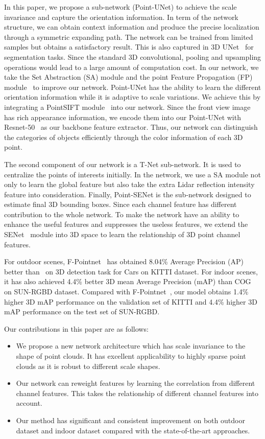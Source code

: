 \documentclass[letterpaper]{article}
\begin{document}
In this paper, we propose a sub-network (Point-UNet) to achieve the scale invariance and capture the orientation information. In term of the network structure, we can obtain context information and produce the precise localization through a symmetric expanding path. The network can be trained from limited samples but obtains a satisfactory result. This is also captured in 3D UNet~\cite{cciccek20163d} for segmentation tasks. Since the standard 3D convolutional, pooling and upsampling operations would lead to a large amount of computation cost. In our network, we take the Set Abstraction (SA) module and the point Feature Propagation (FP) module~\cite{qi2017pointnet++} to improve our network. Point-UNet has the ability to learn the different orientation information while it is adaptive to scale variations. We achieve this by integrating a PointSIFT module~\cite{jiang2018pointsift} into our network. Since the front view image has rich appearance information, we encode them into our Point-UNet with Resnet-50~\cite{he2016deep} as our backbone feature extractor. Thus, our network can distinguish the categories of objects efficiently through the color information of each 3D point.

The second component of our network is a T-Net sub-network. It is used to centralize the points of interests initially. In the network, we use a SA module not only to learn the global feature but also take the extra Lidar reflection intensity feature into consideration. Finally, Point-SENet is the sub-network designed to estimate final 3D bounding boxes. Since each channel feature has different contribution to the whole network. To make the network have an ability to enhance the useful features and suppresses the useless features, we extend the SENet~\cite{hu2017squeeze} module into 3D space to learn the relationship of 3D point channel features.

For outdoor scenes, F-Pointnet~\cite{qi2017frustum} has obtained 8.04\% Average Precision (AP) better than~\cite{chen2017multi} on 3D detection task for Cars on KITTI dataset. For indoor scenes, it has also achieved 4.4\% better 3D mean Average Precision (mAP) than COG~\cite{ren2016three} on SUN-RGBD dataset. Compared with F-Pointnet~\cite{qi2017frustum}, our model obtains 1.4\% higher 3D mAP performance on the validation set of KITTI and 4.4\% higher 3D mAP performance on the test set of SUN-RGBD.

Our contributions in this paper are as follows:

\begin{itemize}
\item We propose a new network architecture which has scale invariance to the shape of point clouds. It has excellent applicability to highly sparse point clouds as it is robust to different scale shapes.
\item Our network can reweight features by learning the correlation from different channel features. This takes the relationship of different channel features into account.
\item Our method has significant and consistent improvement on both outdoor dataset and indoor dataset compared with the state-of-the-art approaches.
\end{itemize}
\end{document}
